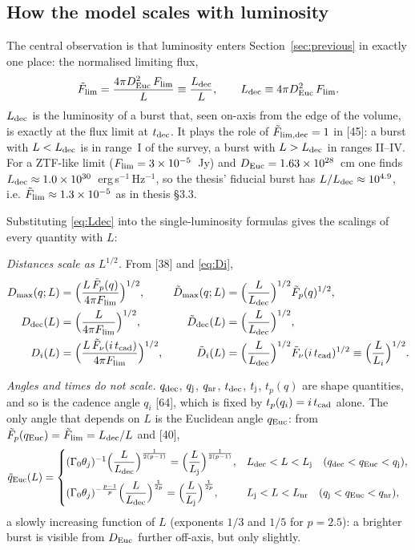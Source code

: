 \documentclass[11pt,a4paper]{article}
\newcommand{\tq}{\tilde{q}}
\newcommand{\tD}{\tilde{D}}
\newcommand{\tF}{\tilde{F}}
\newcommand{\Euc}{{\rm Euc}}
\newcommand{\dec}{{\rm dec}}
\newcommand{\nr}{{\rm nr}}
\newcommand{\Flim}{F_{\rm lim}}
\newcommand{\tFlim}{\tilde{F}_{\rm lim}}
\newcommand{\tcad}{t_{\rm cad}}
\newcommand{\tdec}{t_{\rm dec}}
\newcommand{\tj}{t_{\rm j}}
\newcommand{\Ldec}{L_{\rm dec}}
\newcommand{\Lj}{L_{\rm j}}
\newcommand{\Lnr}{L_{\rm nr}}
\begin{document}
\subsection{How the model scales with luminosity}
\label{sec:scalings}

The central observation is that luminosity enters Section~\ref{sec:previous} in exactly one place: the normalised limiting flux,
\begin{equation}
\label{eq:Ldec}
\tFlim=\frac{4\pi D_\Euc^2\,\Flim}{L}\equiv\frac{\Ldec}{L},\qquad \Ldec\equiv4\pi D_\Euc^2\,\Flim .
\end{equation}
$\Ldec$ is the luminosity of a burst that, seen on-axis from the edge of the volume, is exactly at the flux limit at $\tdec$. It plays the role of $\tF_{\rm lim,dec}=1$ in [45]: a burst with $L<\Ldec$ is in range~I of the survey, a burst with $L>\Ldec$ in ranges II--IV. For a ZTF-like limit ($\Flim=3\times10^{-5}$~Jy) and $D_\Euc=1.63\times10^{28}$~cm one finds $\Ldec\approx1.0\times10^{30}$~erg\,s$^{-1}$\,Hz$^{-1}$, so the thesis' fiducial burst has $L/\Ldec\approx10^{4.9}$, i.e. $\tFlim\approx1.3\times10^{-5}$ as in thesis \S3.3.

Substituting \eqref{eq:Ldec} into the single-luminosity formulas gives the scalings of every quantity with $L$:

\noindent\emph{Distances scale as $L^{1/2}$.} From [38] and \eqref{eq:Di},
\begin{align}
D_{\max}(q;L)&=\Bigl(\frac{L\,\tF_p(q)}{4\pi\Flim}\Bigr)^{1/2},
&\tD_{\max}(q;L)&=\Bigl(\frac{L}{\Ldec}\Bigr)^{1/2}\tF_p(q)^{1/2},\label{eq:DmaxL}\\
D_\dec(L)&=\Bigl(\frac{L}{4\pi\Flim}\Bigr)^{1/2},
&\tD_\dec(L)&=\Bigl(\frac{L}{\Ldec}\Bigr)^{1/2},\label{eq:DdecL}\\
D_i(L)&=\Bigl(\frac{L\,\tF_\nu(i\,\tcad)}{4\pi\Flim}\Bigr)^{1/2},
&\tD_i(L)&=\Bigl(\frac{L}{\Ldec}\Bigr)^{1/2}\tF_\nu(i\,\tcad)^{1/2}\equiv\Bigl(\frac{L}{L_i}\Bigr)^{1/2}.\label{eq:DiL}
\end{align}

\noindent\emph{Angles and times do not scale.} $q_\dec$, $q_{\rm j}$, $q_\nr$, $\tdec$, $\tj$, $t_p(q)$ are shape quantities, and so is the cadence angle $q_i$ [64], which is fixed by $t_p(q_i)=i\,\tcad$ alone. The only angle that depends on $L$ is the Euclidean angle $q_\Euc$: from $\tF_p(q_\Euc)=\tFlim=\Ldec/L$ and [40],
\begin{equation}
\label{eq:qEucL}
\tq_\Euc(L)=\begin{cases}
(\Gamma_0\theta_j)^{-1}\Bigl(\dfrac{L}{\Ldec}\Bigr)^{\frac{1}{2(p-1)}}=\Bigl(\dfrac{L}{\Lj}\Bigr)^{\frac{1}{2(p-1)}}, & \Ldec<L<\Lj\quad(q_\dec<q_\Euc<q_{\rm j}),\\[10pt]
(\Gamma_0\theta_j)^{-\frac{p-1}{p}}\Bigl(\dfrac{L}{\Ldec}\Bigr)^{\frac{1}{2p}}=\Bigl(\dfrac{L}{\Lj}\Bigr)^{\frac{1}{2p}}, & \Lj<L<\Lnr\quad(q_{\rm j}<q_\Euc<q_\nr),
\end{cases}
\end{equation}
a slowly increasing function of $L$ (exponents $1/3$ and $1/5$ for $p=2.5$): a brighter burst is visible from $D_\Euc$ further off-axis, but only slightly.
\end{document}
